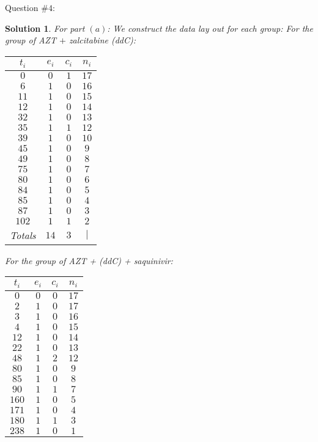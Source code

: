 \documentclass[11pt]{article}
\newtheorem{sol}{Solution}
\begin{document}
Question $\# 4$:
\begin{sol}
	For part $(a)$:\vskip 2mm
	We construct the data lay out for each group:\vskip 2mm
	For the group of AZT $+$ zalcitabine (ddC):
	\begin{tabular}{cccc}
		\hline
		$t_i$&$e_i$&$c_i$&$n_i$\\
		\hline
		$0$& $0$ & $1$ & $17$\\
		$6$& $1$ & $0$ & $16$\\
		$11$ & $1$ & $0$ & $15$\\
		$12$ & $1$ & $0$ & $14$\\
		$32$ & $1$ & $0$ & $13$\\
		$35$ & $1$ & $1$ & $12$\\
		$39$ & $1$ & $0$ & $10$\\
		$45$ & $1$ & $0$ & $9$\\
		$49$ & $1$ & $0$ & $8$\\
		$75$ & $1$ & $0$ & $7$\\
		$80$ & $1$ & $0$ & $6$\\
		$84$ & $1$ & $0$ & $5$\\
		$85$ & $1$ & $0$ & $4$\\
		$87$ & $1$ & $0$ & $3$\\
		$102$ & $1$ & $1$ & $2$\\
		Totals& $14$ & $3$ & $|$\\
	\end{tabular}
	\vskip 2mm
	For the group of AZT + (ddC) + saquinivir:
	\begin{tabular}{cccc}
		\hline
		$t_i$& $e_i$ & $c_i$ & $n_i$\\
		\hline
		$0$ & $0$ & $0$ & $17$\\
		$2$ & $1$ & $0$ & $17$\\
		$3$ & $1$ & $0$ & $16$\\
		$4$ & $1$ & $0$ & $15$\\
		$12$ & $1$ & $0$ & $14$\\
		$22$ & $1$ & $0$ & $13$\\
		$48$ & $1$ & $2$ & $12$\\
		$80$& $1$ & $0$ & $9$\\
		$85$& $1$ & $0$ & $8$\\
		$90$& $1$ & $1$ & $7$\\
		$160$& $1$ & $0$ & $5$\\
		$171$& $1$ & $0$& $4$\\
		$180$& $1$& $1$& $3$\\
		$238$& $1$& $0$& $1$\\

\end{tabular}
\end{sol}
\end{document}
